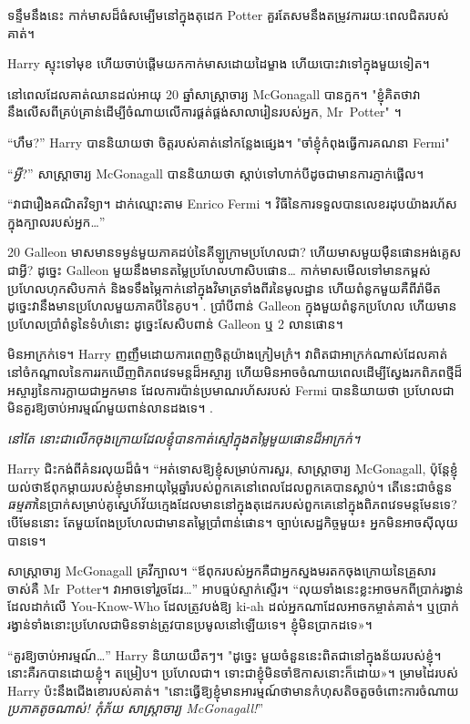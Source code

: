 ទន្ទឹមនឹងនេះ កាក់មាសដ៏ធំសម្បើមនៅក្នុងតុដេក Potter គួរតែសមនឹងតម្រូវការរយៈពេលជិតរបស់គាត់។

Harry ស្ទុះទៅមុខ ហើយចាប់ផ្តើមយកកាក់មាសដោយដៃម្ខាង ហើយបោះវាទៅក្នុងមួយទៀត។

នៅពេលដែលគាត់ឈានដល់អាយុ 20 ឆ្នាំសាស្រ្តាចារ្យ McGonagall បានក្អក។ "ខ្ញុំគិតថាវានឹងលើសពីគ្រប់គ្រាន់ដើម្បីចំណាយលើការផ្គត់ផ្គង់សាលារៀនរបស់អ្នក, Mr~Potter" ។

“ហឹម?” Harry បាននិយាយថា ចិត្តរបស់គាត់នៅកន្លែងផ្សេង។ "ចាំខ្ញុំកំពុងធ្វើការគណនា Fermi"

“\emph{អ្វី}?” សាស្រ្តាចារ្យ McGonagall បាននិយាយថា ស្តាប់ទៅហាក់បីដូចជាមានការភ្ញាក់ផ្អើល។

“វាជារឿងគណិតវិទ្យា។ ដាក់ឈ្មោះតាម Enrico Fermi ។ វិធី​នៃ​ការ​ទទួល​បាន​លេខ​រដុប​យ៉ាង​រហ័ស​ក្នុង​ក្បាល​របស់​អ្នក…”

20 Galleon មាសមានទម្ងន់មួយភាគដប់នៃគីឡូក្រាមប្រហែលជា? ហើយ​មាស​មួយ​ម៉ឺន​ផោន​អង់គ្លេស​ជា​អ្វី? ដូច្នេះ Galleon មួយនឹងមានតម្លៃប្រហែលហាសិបផោន… កាក់មាសមើលទៅមានកម្ពស់ប្រហែលហុកសិបកាក់ និងទទឹងម្ភៃកាក់នៅក្នុងវិមាត្រទាំងពីរនៃមូលដ្ឋាន ហើយពំនូកមួយគឺពីរ៉ាមីត ដូច្នេះវានឹងមានប្រហែលមួយភាគបីនៃគូប។ . ប្រាំបីពាន់ Galleon ក្នុងមួយពំនូកប្រហែល ហើយមានប្រហែលប្រាំពំនូនៃទំហំនោះ ដូច្នេះសែសិបពាន់ Galleon ឬ 2 លានផោន។

មិនអាក្រក់ទេ។ Harry ញញឹមដោយការពេញចិត្តយ៉ាងក្រៀមក្រំ។ វាពិតជាអាក្រក់ណាស់ដែលគាត់នៅចំកណ្តាលនៃការរកឃើញពិភពវេទមន្តដ៏អស្ចារ្យ ហើយមិនអាចចំណាយពេលដើម្បីស្វែងរកពិភពថ្មីដ៏អស្ចារ្យនៃការក្លាយជាអ្នកមាន ដែលការប៉ាន់ប្រមាណរហ័សរបស់ Fermi បាននិយាយថា ប្រហែលជាមិនគួរឱ្យចាប់អារម្មណ៍មួយពាន់លានដងទេ។ .

\emph{នៅតែ នោះជាលើកចុងក្រោយដែលខ្ញុំបានកាត់ស្មៅក្នុងតម្លៃមួយផោនដ៏អាក្រក់។}

Harry ជិះកង់ពីគំនរលុយដ៏ធំ។ “អត់ទោសឱ្យខ្ញុំសម្រាប់ការសួរ, សាស្រ្តាចារ្យ McGonagall, ប៉ុន្តែខ្ញុំយល់ថាឪពុកម្តាយរបស់ខ្ញុំមានអាយុម្ភៃឆ្នាំរបស់ពួកគេនៅពេលដែលពួកគេបានស្លាប់។ តើនេះជាចំនួន\emph{ធម្មតា}នៃប្រាក់សម្រាប់គូស្នេហ៍វ័យក្មេងដែលមាននៅក្នុងតុដេករបស់ពួកគេនៅក្នុងពិភពវេទមន្តមែនទេ? បើមែននោះ តែមួយពែងប្រហែលជាមានតម្លៃប្រាំពាន់ផោន។ ច្បាប់សេដ្ឋកិច្ចមួយ៖ អ្នកមិនអាចស៊ីលុយបានទេ។

សាស្ត្រាចារ្យ McGonagall គ្រវីក្បាល។ “ឪពុករបស់អ្នកគឺជាអ្នកស្នងមរតកចុងក្រោយនៃគ្រួសារចាស់គឺ Mr~Potter។ វាអាចទៅរួចដែរ…” អាបធ្មប់ស្ទាក់ស្ទើរ។ “លុយទាំងនេះខ្លះអាចមកពីប្រាក់រង្វាន់ដែលដាក់លើ You-Know-Who ដែលត្រូវបង់ឱ្យ ki-ah ដល់អ្នកណាដែលអាចកម្ចាត់គាត់។ ឬប្រាក់រង្វាន់ទាំងនោះប្រហែលជាមិនទាន់ត្រូវបានប្រមូលនៅឡើយទេ។ ខ្ញុំ​មិន​ប្រាកដ​ទេ»។

“គួរឱ្យចាប់អារម្មណ៍…” Harry និយាយយឺតៗ។ "ដូច្នេះ មួយចំនួននេះពិតជានៅក្នុងន័យរបស់ខ្ញុំ។ នោះគឺរកបានដោយខ្ញុំ។ តម្រៀប។ ប្រហែលជា។ ទោះ​ជា​ខ្ញុំ​មិន​ចាំ​ឱកាស​នោះ​ក៏​ដោយ»។ ម្រាមដៃរបស់ Harry ប៉ះនឹងជើងខោរបស់គាត់។ "នោះធ្វើឱ្យខ្ញុំមានអារម្មណ៍ថាមានកំហុសតិចតួចចំពោះការចំណាយ\emph{ ប្រភាគតូចណាស់! កុំភ័យ សាស្ត្រាចារ្យ McGonagall!}”

